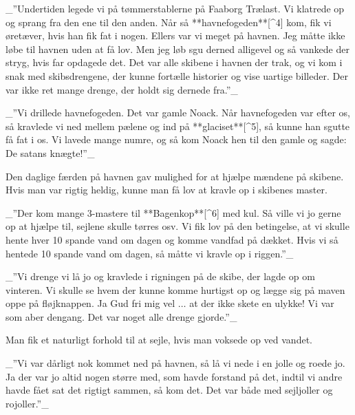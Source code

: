 \documentclass{book}
\begin{document}
_”Undertiden legede vi på tømmerstablerne på Faaborg Trælast. Vi klatrede op og sprang fra
den ene til den anden. Når så **havnefogeden**[^4] kom, fik vi øretæver, hvis han fik fat i nogen.
Ellers var vi meget på havnen. Jeg måtte ikke løbe til havnen uden at få lov. Men jeg løb
sgu derned alligevel og så vankede der stryg, hvis far opdagede det. Det var alle skibene
i havnen der trak, og vi kom i snak med skibsdrengene, der kunne fortælle historier og
vise uartige billeder. Der var ikke ret mange drenge, der holdt sig dernede fra.”_

 _”Vi drillede havnefogeden. Det var gamle Noack. Når havnefogeden var efter os, så kravlede
vi ned mellem pælene og ind på **glaciset**[^5], så kunne han sgutte få fat i os. Vi lavede mange
numre, og så kom Noack hen til den gamle og sagde: De satans knægte!”_

Den daglige færden på havnen gav mulighed for at hjælpe mændene på skibene. Hvis man var
rigtig heldig, kunne man få lov at kravle op i skibenes master.

 _”Der kom mange 3-mastere til **Bagenkop**[^6] med kul. Så ville vi jo gerne op at hjælpe til,
sejlene skulle tørres osv. Vi fik lov på den betingelse, at vi skulle hente hver 10 spande
vand om dagen og komme vandfad på dækket. Hvis vi så hentede 10 spande vand om dagen, så
måtte vi kravle op i riggen.”_



 _”Vi drenge vi lå jo og kravlede i rigningen på de skibe, der lagde op om vinteren. Vi
skulle se hvem der kunne komme hurtigst op og lægge sig på maven oppe på fløjknappen. Ja
Gud fri mig vel $\ldots$ at der ikke skete en ulykke! Vi var som aber dengang. Det var noget alle
drenge gjorde.”_

Man fik et naturligt forhold til at sejle, hvis man voksede op ved vandet.

_”Vi var dårligt nok kommet ned på havnen, så lå vi nede i en jolle og roede jo. Ja der var jo altid nogen
større med, som havde forstand på det, indtil vi andre havde fået sat det rigtigt sammen,
så kom det. Det var både med sejljoller og rojoller.”_
\end{document}
